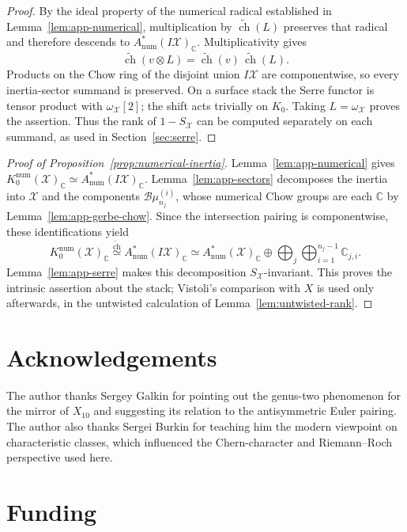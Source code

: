 \documentclass[11pt]{article}
\theoremstyle{plain}
\theoremstyle{definition}
\theoremstyle{remark}
\newcommand{\cX}{\mathcal X}
\newcommand{\C}{\mathbb C}
\newcommand{\1}{\mathbf 1}
\begin{document}
\begin{proof}
By the ideal property of the numerical radical established in Lemma~\ref{lem:app-numerical}, multiplication by $\widetilde{\operatorname{ch}}(L)$ preserves that radical and therefore descends to $A^*_{\mathrm{num}}(I\cX)_{\C}$.  Multiplicativity gives
\[
\widetilde{\operatorname{ch}}(v\otimes L)
=\widetilde{\operatorname{ch}}(v)\,\widetilde{\operatorname{ch}}(L).
\]
Products on the Chow ring of the disjoint union $I\cX$ are componentwise, so every inertia-sector summand is preserved.  On a surface stack the Serre functor is tensor product with $\omega_{\cX}[2]$; the shift acts trivially on $K_0$.  Taking $L=\omega_{\cX}$ proves the assertion.  Thus the rank of $1-S_{\cX}$ can be computed separately on each summand, as used in Section~\ref{sec:serre}.
\end{proof}

\begin{proof}[Proof of Proposition~\ref{prop:numerical-inertia}]
Lemma~\ref{lem:app-numerical} gives $K_0^{\mathrm{num}}(\cX)_{\C}\simeq A^*_{\mathrm{num}}(I\cX)_{\C}$.  Lemma~\ref{lem:app-sectors} decomposes the inertia into $\cX$ and the components $\mathcal B\mu_{n_j}^{(i)}$, whose numerical Chow groups are each $\C$ by Lemma~\ref{lem:app-gerbe-chow}.  Since the intersection pairing is componentwise, these identifications yield
\[
\boxed{
K_0^{\mathrm{num}}(\cX)_{\C}
\overset{\widetilde{\operatorname{ch}}}{\simeq}
A^*_{\mathrm{num}}(I\cX)_{\C}
\simeq A^*_{\mathrm{num}}(\cX)_{\C}
\oplus\bigoplus_j\bigoplus_{i=1}^{n_j-1}\C_{j,i}.}
\]
Lemma~\ref{lem:app-serre} makes this decomposition $S_{\cX}$-invariant.  This proves the intrinsic assertion about the stack; Vistoli's comparison with $X$ is used only afterwards, in the untwisted calculation of Lemma~\ref{lem:untwisted-rank}.
\end{proof}

\section*{Acknowledgements}

The author thanks Sergey Galkin for pointing out the genus-two phenomenon for the mirror of $X_{10}$ and suggesting its relation to the antisymmetric Euler pairing.  The author also thanks Sergei Burkin for teaching him the modern viewpoint on characteristic classes, which influenced the Chern-character and Riemann--Roch perspective used here.

\section*{Funding}
\end{document}
